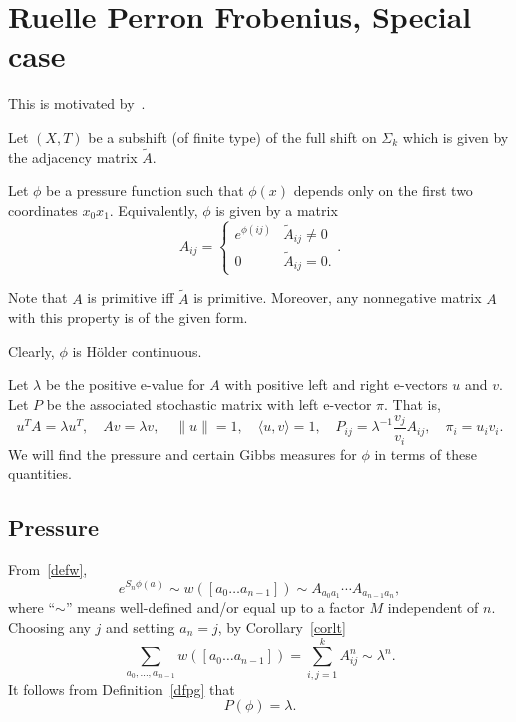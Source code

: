 \documentclass[a4paper]{amsart}
\theoremstyle{plain}
\theoremstyle{definition}
\theoremstyle{remark}
\begin{document}
\section{\textbf{Ruelle Perron Frobenius, Special case}}  This is motivated by~\cite{Kea}.

Let $ (X,T) $ be a subshift (of finite type) of the full shift on $ \Sigma_k $ which is given by the adjacency matrix $ \widetilde{A} $.  

Let  $ \phi $ be a pressure function such that $ \phi(x) $ depends only on the first two coordinates $ x_0x_1 $. Equivalently, $ \phi $ is given by a matrix
\begin{equation} \label{dfA} 
A_{ij} = \begin{cases} e^{\phi(ij)} & \widetilde{A}_{ij} \neq 0 \\
                                              0  &  \widetilde{A}_{ij}= 0.
              \end{cases}.
\end{equation} 
 
 Note that $ A $ is primitive iff $ \widetilde{A} $  is primitive.  Moreover, any nonnegative matrix $ A $ with this property is of the given  form. 
 
 Clearly, $  \phi $ is H\"{o}lder continuous.
 
\medskip Let $ \lambda $  be the positive e-value for $ A $ with positive left and right e-vectors $ u $ and $ v $. Let $ P $ be the associated stochastic matrix with left e-vector $ \pi $.  That is, 
\begin{equation} \label{dfda} 
u^TA = \lambda u^T, \quad Av = \lambda v , \quad \|u \|=1, \quad \langle u,v \rangle = 1,
\quad P_{ij} = \lambda ^{-1}\frac{v_j}{v_i} A_{ij}, \quad \pi_i  = u_i v_i.
\end{equation} 
We will find the pressure and certain Gibbs measures for $ \phi $ in terms of these quantities.

\subsection{Pressure}  From~\eqref{defw},
 \[
 e^{ S_n \phi  (a) }\sim w([a_0\dots a_{n-1}]) \sim A_{a_0a_1}\cdots A_{a_{n-1}a_n},
 \]
 where ``$ \sim $'' means well-defined and/or equal up to a factor $ M $ independent of $ n $. 
 Choosing any $ j $ and setting $ a_n = j $,  by Corollary~\ref{corlt}
 \[
 \sum_{a_0,\dots, a_{n-1}} w([a_0\dots a_{n-1}]) = \sum_{i,j=1}^k A^n_{ij} \sim \lambda ^n.
 \]
It follows from Definition~\ref{dfpg} that 
\[
 P(\phi) = \lambda .
 \]
\end{document}
